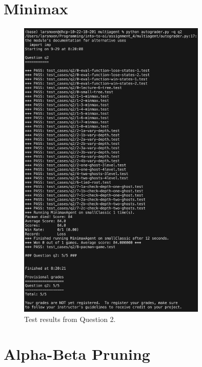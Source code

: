 \section*{Minimax}

\begin{figure}[h!]
    \centering
    \includegraphics[width=0.8\textwidth]{"../Images/q2_result.png"}
    \caption{Test results from Question 2.}
\end{figure}

\newpage

\section*{Alpha-Beta Pruning}

